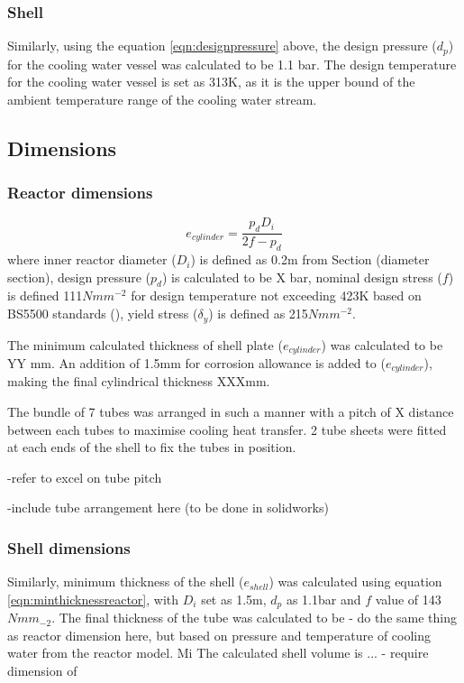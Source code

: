 \subsubsection{Shell}
Similarly, using the equation \ref{eqn:designpressure} above, the design pressure ($d_p$) for the cooling water vessel was calculated to be 1.1 bar. The design temperature for the cooling water vessel is set as 313K, as it is the upper bound of the ambient temperature range of the cooling water stream. 

\subsection{Dimensions}
\label{sec:reactordimensions}

\subsubsection{Reactor dimensions}
\begin{equation}
    e_{cylinder} = \frac{p_dD_i}{2f-p_d}
    \label{eqn:minthicknessreactor}
\end{equation}
where inner reactor diameter ($D_i$) is defined as 0.2m from Section (diameter section), design pressure ($p_d$) is calculated to be X bar, nominal design stress ($f$) is defined 111$Nmm^{-2}$ for design temperature not exceeding 423K based on BS5500 standards (), yield stress ($\delta_y$) is defined as 215$Nmm^{-2}$. 

The minimum calculated thickness of shell plate ($e_{cylinder}$) was calculated to be YY mm. An addition of 1.5mm for corrosion allowance is added to ($e_{cylinder}$), making the final cylindrical thickness XXXmm.

The bundle of 7 tubes was arranged in such a manner with a pitch of X distance between each tubes to maximise cooling heat transfer. 2 tube sheets were fitted at each ends of the shell to fix the tubes in position. 

-refer to excel on tube pitch

-include tube arrangement here (to be done in solidworks)
\subsubsection{Shell dimensions}
Similarly, minimum thickness of the shell ($e_{shell}$) was calculated using equation \ref{eqn:minthicknessreactor}, with $D_i$ set as 1.5m, $d_p$ as 1.1bar and $f$ value of 143$Nmm_{-2}$. The final thickness of the tube was calculated to be 
- do the same thing as reactor dimension here, but based on pressure and temperature of cooling water from the reactor model. Mi
The calculated shell volume is ...
- require dimension of 
